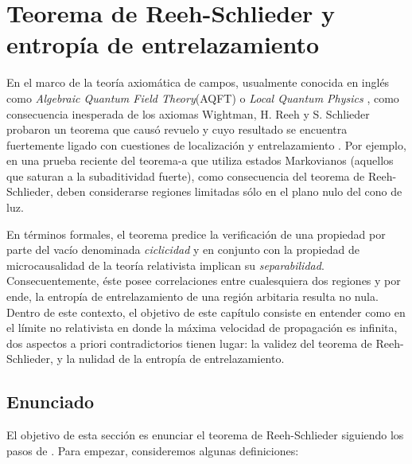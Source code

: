 \chapter{Teorema de Reeh-Schlieder y entropía de entrelazamiento}\label{cap3}

En el marco de la teoría axiomática de campos, usualmente conocida en inglés como \textit{Algebraic Quantum Field Theory}(AQFT) o \textit{Local Quantum Physics} \cite{Haag:1992hx}, como consecuencia inesperada de los axiomas Wightman\cite{Wightman:2016}, H. Reeh y S. Schlieder probaron un teorema que causó revuelo y cuyo resultado se encuentra fuertemente ligado con cuestiones de localización y entrelazamiento \cite{reeh_sch}. Por ejemplo, en una prueba reciente del teorema-a \cite{Casini:2017vbe} que utiliza estados Markovianos (aquellos que saturan a la subaditividad fuerte), como consecuencia del teorema de Reeh-Schlieder, deben considerarse regiones limitadas sólo en el plano nulo del cono de luz.

En términos formales, el teorema predice la verificación de una propiedad por parte del vacío denominada \textit{ciclicidad} y en conjunto con la propiedad de microcausalidad de la teoría relativista implican su \textit{separabilidad}. Consecuentemente, éste posee correlaciones entre cualesquiera dos regiones y por ende, la entropía de entrelazamiento de una región arbitaria resulta no nula. Dentro de este contexto, el objetivo de este capítulo consiste en entender como en el límite no relativista en donde la máxima velocidad de propagación es infinita, dos aspectos a priori contradictorios tienen lugar: la validez del teorema de Reeh-Schlieder, y la nulidad de la entropía de entrelazamiento. 



\section{Enunciado}
El objetivo de esta sección es enunciar el teorema de Reeh-Schlieder siguiendo los pasos de \cite{Witten:2018lha}. Para empezar, consideremos algunas definiciones:

